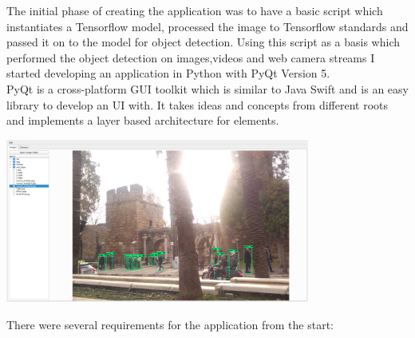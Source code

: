 
The initial phase of creating the application was to have a basic script which instantiates a Tensorflow model, processed the image to
Tensorflow standards and passed it on to the model for object detection. Using this script as a basis which performed the object detection
on images,videos and web camera streams I started developing an application in Python with PyQt Version 5.\\
PyQt is a cross-platform GUI toolkit which is similar to Java Swift and is an easy library to develop an UI with. It takes ideas and concepts
from different roots and implements a layer based architecture for elements.
\begin{center}
    \includegraphics[width=0.75\textwidth]{images/application/Application.png}
\end{center}
There were several requirements for the application from the start:
